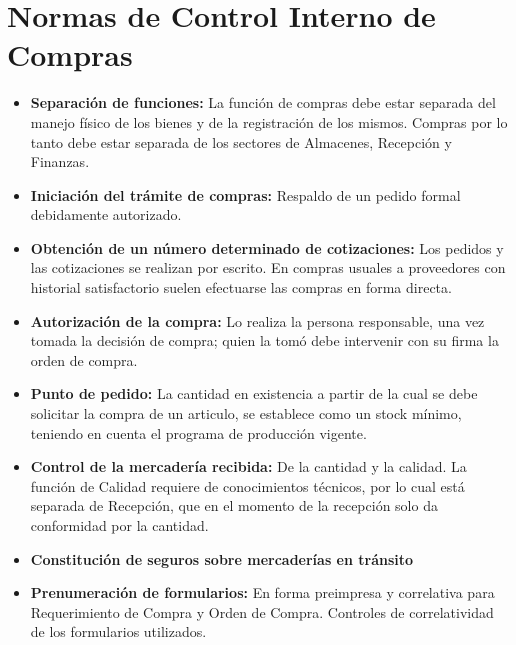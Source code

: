 \pagebreak
\section{Normas de Control Interno de Compras}
\begin{itemize}

 \item	{\bf Separaci\'on de funciones: } La función de compras debe estar separada del manejo físico de los bienes y de la registración de los mismos. Compras por lo tanto debe estar separada de los sectores de
Almacenes, Recepción y Finanzas.

 \item	{\bf Iniciación del trámite de compras: } Respaldo de un pedido formal debidamente autorizado.

 \item	{\bf Obtención de un número determinado de cotizaciones: } Los
pedidos y las cotizaciones se realizan por escrito. En compras usuales a proveedores con historial satisfactorio suelen efectuarse las compras en forma directa.

 \item	{\bf Autorización de la compra: } Lo realiza la persona responsable, una vez tomada la decisión de compra; quien la tomó debe intervenir con su firma la orden de compra.

 \item	{\bf Punto de pedido: } La cantidad en existencia a partir de la cual se debe solicitar la compra de un articulo, se establece como un stock mínimo, teniendo en cuenta el programa de producción vigente.

 \item	{\bf Control de la mercadería recibida: } De la cantidad y la calidad. La función de Calidad requiere de conocimientos técnicos, por lo cual está separada de Recepción, que en el
momento de la recepción solo da conformidad por la cantidad.

 \item	{\bf Constitución de seguros sobre mercaderías en tránsito }
 
 \item	{\bf Prenumeración de formularios: } En forma preimpresa y correlativa para Requerimiento de Compra y Orden de
Compra. Controles de correlatividad de
los formularios utilizados.

\end{itemize}
